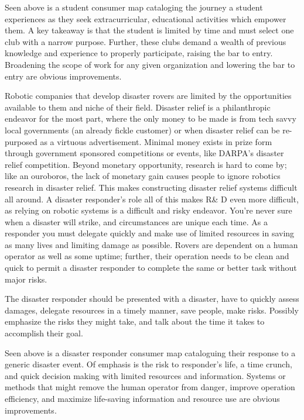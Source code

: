 \documentclass[a4paper, 10pt]{article}
\begin{document}
		Seen above is a student consumer map cataloging the journey a student experiences as they seek extracurricular, educational activities which empower them. A key takeaway is that the student is limited by time and must select one club with a narrow purpose. Further, these clubs demand a wealth of previous knowledge and experience to properly participate, raising the bar to entry. Broadening the scope of work for any given organization and lowering the bar to entry are obvious improvements.
		
		Robotic companies that develop disaster rovers are limited by the opportunities available to them and niche of their field. Disaster relief is a philanthropic endeavor for the most part, where the only money to  be made is from tech savvy local governments (an already fickle customer) or when disaster relief can be re-purposed as a virtuous advertisement. Minimal money exists in prize form through government sponsored competitions or events, like DARPA's disaster relief competition. Beyond monetary opportunity, research is hard to come by; like an ouroboros, the lack of monetary gain causes people to ignore robotics research in disaster relief. This makes constructing disaster relief systems difficult all around. A disaster responder's role all of this makes R\& D even more difficult, as relying on robotic systems is a difficult and risky endeavor. You're never sure when a disaster will strike, and circumstances are unique each time. As a responder you must delegate quickly and make use of limited resources in saving as many lives and limiting damage as possible. Rovers are dependent on a human operator as well as some uptime; further, their operation needs to be clean and quick to permit a disaster responder to complete the same or better task without major risks.
		
		
		The disaster responder should be presented with a disaster, have to quickly assess damages, delegate  resources in a timely manner, save people, make risks. Possibly emphasize the risks they might take, and talk about the time it takes to accomplish their goal. 
		
		Seen above is a disaster responder consumer map cataloguing their response to a generic disaster event. Of emphasis is the risk to responder's life, a time crunch, and quick decision making with limited resources and information. Systems or methods that might remove the human operator from danger, improve operation efficiency, and maximize life-saving information and resource use are obvious improvements.
		
\end{document}

